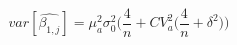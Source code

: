 \begin{equation}
var[\hat{\beta_{1,j}}] =\mu_a^2\sigma_0^2\Big(\frac{4}{n} + CV_{a}^2\Big(\frac{4}{n} + \delta^2\Big)\Big)
\end{equation}
